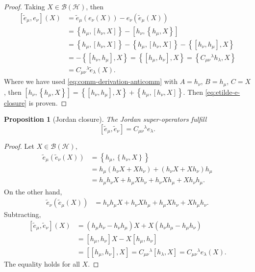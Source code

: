 \documentclass[notitlepage,aip,reprint,onecolumn]{revtex4-1}
\newtheorem{proposition}[theorem]{Proposition}
\theoremstyle{definition}
\newcommand{\HH}{\mathcal H}
\newcommand{\BH}{\mathcal B(\HH)}
\renewcommand{\comm}[2]{\left[#1,#2\right]}
\newcommand{\acom}[2]{\left\{#1,#2\right\}}
\begin{document}
\begin{proof}
Taking $X\in\BH$, then
\begin{align*}
     \comm{\widetilde e_\mu}{e_\nu}(X)
     &=\widetilde e_\mu(e_\nu(X))-e_\nu(\widetilde e_\mu(X))
     \\
     &=\acom{h_\mu}{\comm{h_\nu}{X}}
     -\comm{h_\nu}{\acom{h_\mu}{X}}
     \\
     &=\acom{h_\mu}{\comm{h_\nu}{X}}
     -\acom{h_\mu}{\comm{h_\nu}{X}}
     -\acom{\comm{h_\nu}{h_\mu}}{X}
     \\
     &=-\acom{\comm{h_\nu}{h_\mu}}{X}=\acom{\comm{h_\mu}{h_\nu}}{X}=\acom{C_{\mu\nu}{}^\lambda h_\lambda}{X}
     \\
     &=C_{\mu\nu}{}^\lambda\widetilde e_\lambda(X).
\end{align*}
Where we have used \eqref{eq:comm-derivation-anticomm} with $A=h_\nu$, $B=h_\mu$, $C=X$, then \( \comm{h_\nu}{\acom{h_\mu}{X}}=\acom{\comm{h_\nu}{h_\mu}}{X}+\acom{h_\mu}{\comm{h_\nu}{X}}\).
Then \eqref{eq:etilde-e-closure} is proven.
\end{proof}
\begin{proposition}[Jordan closure]
The Jordan super-operators fulfill
\begin{equation} \label{eq:etilde-etilde-closure}
     \comm{\widetilde e_\mu}{\widetilde e_\nu}=C_{\mu\nu}{}^\lambda e_\lambda.
\end{equation}
\end{proposition}
\begin{proof}
Let $X\in\BH$,
\begin{align*}
     \widetilde e_\mu(\widetilde e_\nu(X))
     &=\acom{h_\mu}{\acom{h_\nu}{X}}
     \\
     &=h_\mu(h_\nu X+Xh_\nu)+(h_\nu X+Xh_\nu)h_\mu
     \\
     &=h_\mu h_\nu X+h_\mu Xh_\nu+h_\nu Xh_\mu+Xh_\nu h_\mu.
\end{align*}
On the other hand,
\begin{align*}
     \widetilde e_\nu(\widetilde e_\mu(X))
     &=h_\nu h_\mu X+h_\nu Xh_\mu+h_\mu Xh_\nu+Xh_\mu h_\nu.
\end{align*}
Subtracting,
\begin{align*}
     \comm{\widetilde e_\mu}{\widetilde e_\nu}(X)
     &=(h_\mu h_\nu-h_\nu h_\mu)X+X(h_\nu h_\mu-h_\mu h_\nu)
     \\
     &=\comm{h_\mu}{h_\nu}X-X\comm{h_\mu}{h_\nu}
     \\
     &=\comm{\comm{h_\mu}{h_\nu}}{X}=C_{\mu\nu}{}^\lambda\comm{h_\lambda}{X}
     =C_{\mu\nu}{}^\lambda e_\lambda(X).
\end{align*}
The equality holds for all $X$.
\end{proof}
\end{document}
